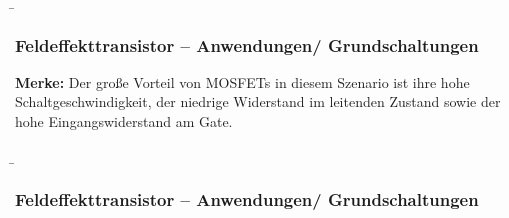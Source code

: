 \begin{frame}
    \b{\frametitle{Feldeffekttransistor -- Anwendungen/ Grundschaltungen}
        \textbf{Merke:}
        Der große Vorteil von MOSFETs in
        diesem Szenario ist ihre hohe Schaltgeschwindigkeit, der niedrige Widerstand im leitenden Zustand
        sowie der hohe Eingangswiderstand am Gate.
        }
\end{frame}

\begin{frame}
    \b{ \frametitle{Feldeffekttransistor -- Anwendungen/ Grundschaltungen}
        \begin{figure}[H]
            \begin{minipage}[h]{0.48\textwidth}
                \centering
                
            \end{minipage}
            \begin{minipage}[c]{0.48\textwidth}
                \centering
                  
            \end{minipage}
        \end{figure}
    }
\end{frame}









